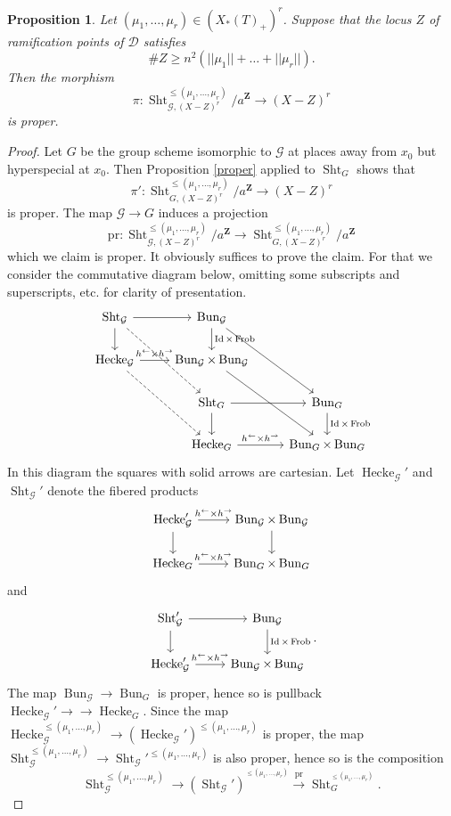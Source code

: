 \documentclass[reqno]{amsart}
\numberwithin{equation}{section}
\newcommand{\Z}{\mathbf{Z}}
\newcommand{\Cal}[1]{\mathcal{#1}}
\newcommand{\co}{\colon}
\newcommand{\mrm}[1]{\mathrm{#1}}
\DeclareMathOperator{\Frob}{Frob}
\DeclareMathOperator{\Bun}{Bun}
\DeclareMathOperator{\Id}{Id}
\DeclareMathOperator{\Sht}{Sht}
\DeclareMathOperator{\Hecke}{Hecke}
\newtheorem{prop}[thm]{Proposition}
\theoremstyle{remark}
\numberwithin{equation}{section}
\begin{document}
\begin{prop}\label{prop: integral model proper}
Let $ (\mu_1, \ldots, \mu_r) \in (X_*(T)_+)^r$. Suppose that the locus $Z$ of ramification points of $\Cal{D}$ satisfies
\[
\# Z  \geq n^2 (||\mu_1|| + \ldots + || \mu_r||). 
\]
Then the morphism 
\[
\pi \co \Sht_{\Cal{G},(X-Z)^r}^{\leq  (\mu_1, \ldots, \mu_r) }/a^{\Z} \rightarrow (X-Z)^r
\]
is proper. 
\end{prop}

\begin{proof}
Let $G$ be the group scheme isomorphic to $\Cal{G}$ at places away from $x_0$ but hyperspecial at $x_0$. Then Proposition \ref{proper} applied to $\Sht_G$ shows that 
\[
\pi' \co \Sht_{G,(X-Z)^r}^{\leq  (\mu_1, \ldots, \mu_r) }/a^{\Z} \rightarrow (X-Z)^r
\]
is proper. The map $\Cal{G} \rightarrow G$ induces a projection
\[
\mrm{pr} \co  \Sht_{\Cal{G},(X-Z)^r}^{\leq  (\mu_1, \ldots, \mu_r) }/a^{\Z} \rightarrow  \Sht_{G,(X-Z)^r}^{\leq  (\mu_1, \ldots, \mu_r) }/a^{\Z}
\]
which we claim is proper. It obviously suffices to prove the claim. For that we consider the commutative diagram below, omitting some subscripts and superscripts, etc. for clarity of presentation. 
\[
\begin{tikzcd}
\Sht_{\Cal{G}} \ar[r]  \ar[ddr, dashed] \ar[d] & \Bun_{\Cal{G}}  \ar[d, "\Id \times \Frob"] \ar[ddr] \\
\Hecke_{\Cal{G}} \ar[r, "h^{\leftarrow} \times h^{\rightarrow}"] \ar[ddr, dashed] & \Bun_{\Cal{G}}  \times \Bun_{\Cal{G}} \ar[ddr] \\
&  \Sht_{G} \ar[r]   \ar[d] & \Bun_{G}  \ar[d, "\Id \times \Frob"] \\
&  \Hecke_{G} \ar[r, "h^{\leftarrow} \times h^{\rightarrow}"] & \Bun_{G}  \times \Bun_{G}
\end{tikzcd}
\]
In this diagram the squares with solid arrows are cartesian. Let $\Hecke_{\Cal{G}}'$ and $\Sht_{\Cal{G}}'$ denote the fibered products 
\[
\begin{tikzcd}
\Hecke_{\Cal{G}}' \ar[r, "h^{\leftarrow} \times h^{\rightarrow}"] \ar[d]& 
\Bun_{\Cal{G}}  \times \Bun_{\Cal{G}} \ar[d] \\
 \Hecke_{G} \ar[r, "h^{\leftarrow} \times h^{\rightarrow}"] & \Bun_{G}  \times \Bun_{G}
\end{tikzcd}
\]
and 
\[
\begin{tikzcd}
\Sht_{\Cal{G}}' \ar[r]   \ar[d] & \Bun_{\Cal{G}}  \ar[d, "\Id \times \Frob"] \\
\Hecke_{\Cal{G}}' \ar[r, "h^{\leftarrow} \times h^{\rightarrow}"] & \Bun_{\Cal{G}}  \times \Bun_{\Cal{G}}
\end{tikzcd}.
\]
The map $\Bun_{\Cal{G}} \rightarrow \Bun_G$ is proper, hence so is pullback $\Hecke_{\Cal{G}}'  \rightarrow \rightarrow \Hecke_G$. Since the map $\Hecke_{\Cal{G}}^{\leq  (\mu_1, \ldots, \mu_r) } \rightarrow (\Hecke_{\Cal{G}}')^{\leq  (\mu_1, \ldots, \mu_r) }$ is proper, the map $\Sht_{\Cal{G}}^{\leq  (\mu_1, \ldots, \mu_r) } \rightarrow \Sht_{\Cal{G}}'^{\leq  (\mu_1, \ldots, \mu_r) }$ is also proper, hence so is the composition 
\[
\Sht_{\Cal{G}}^{\leq  (\mu_1, \ldots, \mu_r) } \rightarrow (\Sht_{\Cal{G}}')^{^{\leq  (\mu_1, \ldots, \mu_r) }} \xrightarrow{\mrm{pr}} \Sht_G^{^{\leq  (\mu_1, \ldots, \mu_r) }}.
\] 
\end{proof}
\end{document}
